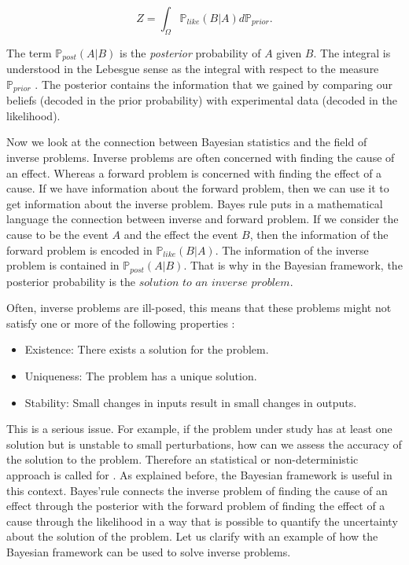 \documentclass[12pt]{book}
\newcommand{\post}{\mathbb{P}_{post}}
\newcommand{\like}{\mathbb{P}_{like}}
\newcommand{\prior}{\mathbb{P}_{prior}}
\begin{document}
\begin{equation}\label{eqnNormalizationConstant}
Z=\int_{\Omega} \like(B|A)d\prior.
\end{equation}

The term $\post(A|B)$ is  the \textit{posterior} probability of $A$ given $B$. The integral
is understood in the  Lebesgue sense as the  integral with respect to the measure $\prior$ \cite{lerner2014course}. 
The posterior contains  the information 
that we gained by comparing our beliefs (decoded in the prior probability) with experimental data 
(decoded in the likelihood). 
\newline



Now we look at the connection between Bayesian statistics and  the field of inverse problems. 
Inverse problems are  often concerned with finding the cause of an effect. Whereas a forward
problem is concerned with finding the effect of a cause. If we have information about the 
forward problem, then we can use it to get information about the inverse problem. Bayes rule
puts in a mathematical language the connection between inverse and forward problem. 
If we consider the cause to be the
event $A$ and the effect the event $B$, then the information of the forward problem
is encoded in $\like(B|A)$. The information of the inverse problem is contained in 
$\post(A|B)$. That is why in the Bayesian framework, the posterior probability
is the $\textit{solution to an inverse problem}$.

Often, inverse problems
are ill-posed, this means
that these problems might  not satisfy one or more of the following properties \cite{lebedev2012functional}:

\begin{itemize}
\item Existence: There exists a solution for the problem.
\item Uniqueness: The problem has a unique solution.
\item Stability: Small changes in inputs result in small changes in outputs.
\end{itemize}
This is a serious issue. For example, if the problem under study has at least one solution
but is unstable to small perturbations, how can we assess the accuracy of the solution to 
the problem. 
Therefore an statistical or non-deterministic approach is called for . As explained before, the Bayesian framework 
is useful in this context. Bayes'rule connects the inverse problem  of finding the cause
of an effect through the posterior with the forward problem of finding the effect of a cause
through the likelihood in a way that is possible to quantify the uncertainty about the solution
of the problem. Let us  clarify with an example of how the Bayesian framework can be used to solve inverse problems. 
\newline
\end{document}

